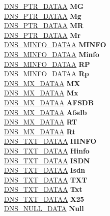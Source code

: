 \begin{DoxyCompactItemize}
\begin{tabbing}
\>\hyperlink{struct_d_n_s___p_t_r___d_a_t_a_a}{DNS\_PTR\_DATAA} {\bfseries MG}\\
\>\hyperlink{struct_d_n_s___p_t_r___d_a_t_a_a}{DNS\_PTR\_DATAA} {\bfseries Mg}\\
\>\hyperlink{struct_d_n_s___p_t_r___d_a_t_a_a}{DNS\_PTR\_DATAA} {\bfseries MR}\\
\>\hyperlink{struct_d_n_s___p_t_r___d_a_t_a_a}{DNS\_PTR\_DATAA} {\bfseries Mr}\\
\>\hyperlink{struct_d_n_s___m_i_n_f_o___d_a_t_a_a}{DNS\_MINFO\_DATAA} {\bfseries MINFO}\\
\>\hyperlink{struct_d_n_s___m_i_n_f_o___d_a_t_a_a}{DNS\_MINFO\_DATAA} {\bfseries Minfo}\\
\>\hyperlink{struct_d_n_s___m_i_n_f_o___d_a_t_a_a}{DNS\_MINFO\_DATAA} {\bfseries RP}\\
\>\hyperlink{struct_d_n_s___m_i_n_f_o___d_a_t_a_a}{DNS\_MINFO\_DATAA} {\bfseries Rp}\\
\>\hyperlink{struct_d_n_s___m_x___d_a_t_a_a}{DNS\_MX\_DATAA} {\bfseries MX}\\
\>\hyperlink{struct_d_n_s___m_x___d_a_t_a_a}{DNS\_MX\_DATAA} {\bfseries Mx}\\
\>\hyperlink{struct_d_n_s___m_x___d_a_t_a_a}{DNS\_MX\_DATAA} {\bfseries AFSDB}\\
\>\hyperlink{struct_d_n_s___m_x___d_a_t_a_a}{DNS\_MX\_DATAA} {\bfseries Afsdb}\\
\>\hyperlink{struct_d_n_s___m_x___d_a_t_a_a}{DNS\_MX\_DATAA} {\bfseries RT}\\
\>\hyperlink{struct_d_n_s___m_x___d_a_t_a_a}{DNS\_MX\_DATAA} {\bfseries Rt}\\
\>\hyperlink{struct_d_n_s___t_x_t___d_a_t_a_a}{DNS\_TXT\_DATAA} {\bfseries HINFO}\\
\>\hyperlink{struct_d_n_s___t_x_t___d_a_t_a_a}{DNS\_TXT\_DATAA} {\bfseries Hinfo}\\
\>\hyperlink{struct_d_n_s___t_x_t___d_a_t_a_a}{DNS\_TXT\_DATAA} {\bfseries ISDN}\\
\>\hyperlink{struct_d_n_s___t_x_t___d_a_t_a_a}{DNS\_TXT\_DATAA} {\bfseries Isdn}\\
\>\hyperlink{struct_d_n_s___t_x_t___d_a_t_a_a}{DNS\_TXT\_DATAA} {\bfseries TXT}\\
\>\hyperlink{struct_d_n_s___t_x_t___d_a_t_a_a}{DNS\_TXT\_DATAA} {\bfseries Txt}\\
\>\hyperlink{struct_d_n_s___t_x_t___d_a_t_a_a}{DNS\_TXT\_DATAA} {\bfseries X25}\\
\>\hyperlink{struct_d_n_s___n_u_l_l___d_a_t_a}{DNS\_NULL\_DATA} {\bfseries Null}\\

\end{tabbing}
\end{DoxyCompactItemize}
